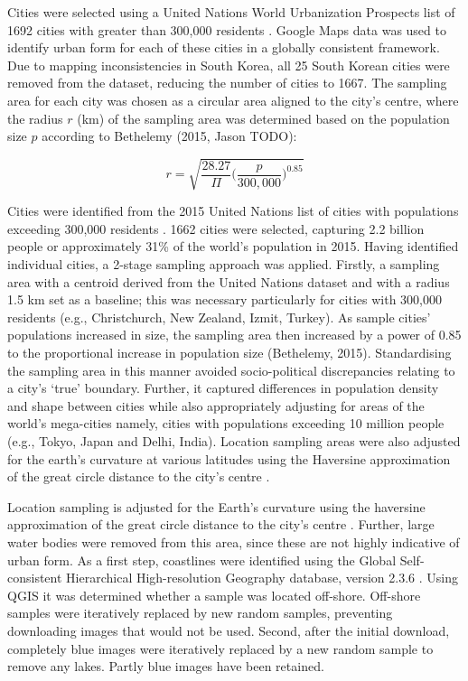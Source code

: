 \documentclass[sageh,times]{sagej}
\begin{document}
Cities were selected using a United Nations World Urbanization Prospects list of 1692 cities with greater than 300,000 residents \citep{UN2014}. Google Maps data was used to identify urban form for each of these cities in a globally consistent framework. Due to mapping inconsistencies in South Korea, all 25 South Korean cities were removed from the dataset, reducing the number of cities to 1667. The sampling area for each city was chosen as a circular area aligned to the city's centre, where the radius $r$ (km) of the sampling area was determined based on the population size $p$ according to Bethelemy (2015, Jason TODO):

\begin{equation}
r = \sqrt{ \frac{28.27}{\Pi} \bigg( \frac{p}{300,000}  \bigg)^{0.85} }
\end{equation}

Cities were identified from the 2015 United Nations list of cities with populations exceeding 300,000 residents \citep{UN2014}. 1662 cities were selected, capturing 2.2 billion people or approximately 31\% of the world's population in 2015. Having identified individual cities, a 2-stage sampling approach was applied. Firstly, a sampling area with a centroid derived from the United Nations dataset and with a radius 1.5 km set as a baseline; this was necessary particularly for cities with 300,000 residents (e.g., Christchurch, New Zealand, Izmit, Turkey). As sample cities' populations increased in size, the sampling area then increased by a power of 0.85 to the proportional increase in population size (Bethelemy, 2015). Standardising the sampling area in this manner avoided socio-political discrepancies relating to a city's `true' boundary. Further, it captured differences in population density and shape between cities while also appropriately adjusting for areas of the world's mega-cities namely, cities with populations exceeding 10 million people (e.g., Tokyo, Japan and Delhi, India). Location sampling areas were also adjusted for the earth's curvature at various latitudes using the Haversine approximation of the great circle distance to the city's centre \citep{Sinnott1984}. 

Location sampling is adjusted for the Earth's curvature using the haversine approximation of the great circle distance to the city's centre \citep{Sinnott1984}. Further, large water bodies were removed from this area, since these are not highly indicative of urban form. As a first step, coastlines were identified using the Global Self-consistent Hierarchical High-resolution Geography database, version 2.3.6 \citep{Wessel1996}. Using QGIS \citep{QGIS2009} it was determined whether a sample was located off-shore. Off-shore samples were iteratively replaced by new random samples, preventing downloading images that would not be used. Second, after the initial download, completely blue images were iteratively replaced by a new random sample to remove any lakes. Partly blue images have been retained.
\end{document}
